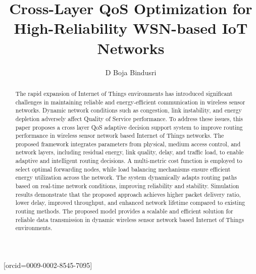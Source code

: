 \documentclass[a4paper,fleqn]{cas-dc}
\numberwithin{equation}{section}
\begin{document}
\let\WriteBookmarks\relax
\def\floatpagepagefraction{1}
\def\textpagefraction{.001}


\title [mode = title]{Cross-Layer QoS Optimization for High-Reliability WSN-based IoT Networks}                      





\author[1]{ D Boja Bindusri}[orcid=0009-0002-8545-7095]
\address[1]{School of Computer Science and Engineering, VIT-AP University, Amaravathi. Andhra Pradesh, India}




\begin{abstract}
The rapid expansion of Internet of Things environments has introduced significant challenges in maintaining reliable and energy-efficient communication in wireless sensor networks. Dynamic network conditions such as congestion, link instability, and energy depletion adversely affect Quality of Service performance. To address these issues, this paper proposes a cross layer QoS adaptive decision support system to improve routing performance in wireless sensor network based Internet of Things networks. The proposed framework integrates parameters from physical, medium access control, and network layers, including residual energy, link quality, delay, and traffic load, to enable adaptive and intelligent routing decisions. A multi-metric cost function is employed to select optimal forwarding nodes, while load balancing mechanisms ensure efficient energy utilization across the network. The system dynamically adapts routing paths based on real-time network conditions, improving reliability and stability. Simulation results demonstrate that the proposed approach achieves higher packet delivery ratio, lower delay, improved throughput, and enhanced network lifetime compared to existing routing methods. The proposed model provides a scalable and efficient solution for reliable data transmission in dynamic wireless sensor network based Internet of Things environments.

\end{abstract}
\end{document}

